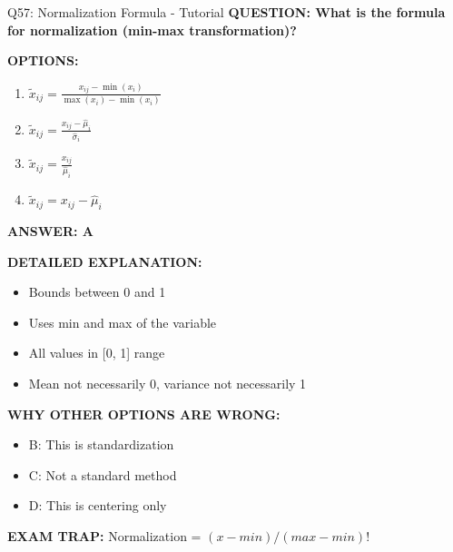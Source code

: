 \documentclass[8pt]{beamer}
\begin{document}
	\begin{frame}{Q57: Normalization Formula - Tutorial}
		\fontsize{6.5}{7.5}\selectfont
		\textbf{QUESTION: What is the formula for normalization (min-max transformation)?}
		
		\vspace{0.1cm}
		\textbf{OPTIONS:}
		\begin{enumerate}
			\item $\tilde{x}_{ij} = \frac{x_{ij} - \min(x_i)}{\max(x_i) - \min(x_i)}$
			\item $\tilde{x}_{ij} = \frac{x_{ij} - \hat{\mu}_i}{\hat{\sigma}_i}$
			\item $\tilde{x}_{ij} = \frac{x_{ij}}{\hat{\mu}_i}$
			\item $\tilde{x}_{ij} = x_{ij} - \hat{\mu}_i$
		\end{enumerate}
		
		\vspace{0.1cm}
		\textcolor{myblue}{\textbf{ANSWER: A}}
		
		\vspace{0.1cm}
		\textbf{DETAILED EXPLANATION:}
		\begin{itemize}
			\item Bounds between 0 and 1
			\item Uses min and max of the variable
			\item All values in [0, 1] range
			\item Mean not necessarily 0, variance not necessarily 1
		\end{itemize}
		
		\vspace{0.1cm}
		\textcolor{myred}{\textbf{WHY OTHER OPTIONS ARE WRONG:}}
		\begin{itemize}
			\item \textcolor{myred}{B:} This is standardization
			\item \textcolor{myred}{C:} Not a standard method
			\item \textcolor{myred}{D:} This is centering only
		\end{itemize}
		
		\textcolor{myred}{\textbf{EXAM TRAP:}} Normalization = \textcolor{myblue}{$(x - min) / (max - min)$}!
	\end{frame}
	
\end{document}
